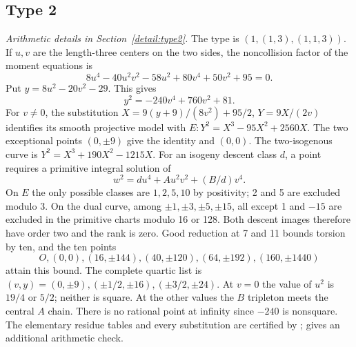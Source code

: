 \subsection{Type 2}\label{app:type2}
\noindent\emph{Arithmetic details in Section~\ref{detail:type2}.}\enspace
The type is $(1,(1,3),(1,1,3))$. If $u,v$ are the length-three
centers on the two sides, the noncollision factor of the moment equations is
\[
 8u^4-40u^2v^2-58u^2+80v^4+50v^2+95=0.
\]
Put $y=8u^2-20v^2-29$. This gives
\[
 y^2=-240v^4+760v^2+81.
\]
For $v\ne0$, the substitution
$X=9(y+9)/(8v^2)+95/2$, $Y=9X/(2v)$ identifies its smooth projective
model with $E:Y^2=X^3-95X^2+2560X$. The two exceptional points
$(0,\pm9)$ give the identity and $(0,0)$. The two-isogenous curve is
$Y^2=X^3+190X^2-1215X$. For an isogeny descent class $d$, a point
requires a primitive integral solution of
\[
 w^2=du^4+Au^2v^2+(B/d)v^4.
\]
On $E$ the only possible classes are $1,2,5,10$ by positivity; 2 and 5
are excluded modulo 3. On the dual curve, among $\pm1,\pm3,\pm5,\pm15$,
all except 1 and $-15$ are excluded in the primitive charts modulo
16 or 128. Both descent images therefore have order two and the rank is
zero. Good reduction at 7 and 11 bounds torsion by ten, and the ten points
\[
 O,(0,0),(16,\pm144),(40,\pm120),(64,\pm192),(160,\pm1440)
\]
attain this bound. The complete quartic list is
$(v,y)=(0,\pm9),(\pm1/2,\pm16),(\pm3/2,\pm24)$.
At $v=0$ the value of $u^2$ is $19/4$ or $5/2$; neither is square.
At the other values the $B$ tripleton meets the central $A$ chain.
There is no rational point at infinity since $-240$ is nonsquare.
The elementary residue tables and every substitution are certified by
;  gives
an additional arithmetic check.

